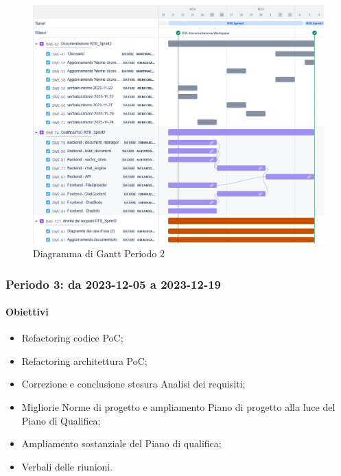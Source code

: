 \documentclass[10pt, a4paper]{article}
\begin{document}
{{{{{{{{\begin{itemize}
\end{itemize}
\vspace{1em}

 \begin{figure}[H]
        \centering        
        \includegraphics[width=15.5cm]{ganttPeriodo2.png}
        \caption{Diagramma di Gantt Periodo 2 }
    \end{figure}
\subsubsection{Periodo 3: da 2023-12-05 a 2023-12-19}
\paragraph{Obiettivi}
\begin{itemize}
    \item Refactoring codice PoC;
    \item Refactoring architettura PoC;
    \item Correzione e conclusione stesura Analisi dei requisiti;
    \item Migliorie Norme di progetto e ampliamento Piano di progetto alla luce del Piano di Qualifica;
    \item Ampliamento sostanziale del Piano di qualifica;
    \item Verbali delle riunioni.
\end{itemize}

}}}}}}}}
\end{document}
